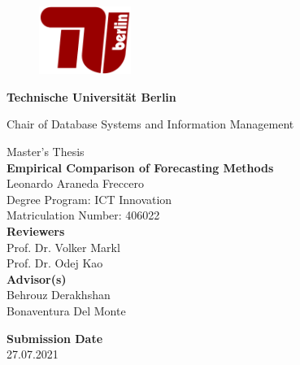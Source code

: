 \thispagestyle{empty}
\begin{center}

    \begin{figure}[t]
        \centering
        \includegraphics[width=3cm]{./img/TU-Berlin-Logo.pdf}%
    \end{figure}

    {\LARGE \textbf{Technische Universit\"at Berlin}}

    \vspace{0.5cm}

    {\large Chair of Database Systems and Information Management\\[1.6mm]}


    \vspace{2cm}

    {\LARGE Master's Thesis}\\

    \vspace{2.4cm}
    {\LARGE \textbf{Empirical Comparison of Forecasting Methods}}\\
    \vspace{1.0cm}
    Leonardo Araneda Freccero \\
    Degree Program: ICT Innovation\\
    Matriculation Number: 406022\\

    \vspace*{2.4cm}
    \textbf{Reviewers}\\
    Prof. Dr. Volker Markl\\
    Prof. Dr. Odej Kao\\
    \vspace*{0.4cm}
    \textbf{Advisor(s)}\\
    Behrouz Derakhshan\\
    Bonaventura Del Monte\\
    \vspace{0.4 cm}

    \textbf{Submission Date}\\
    27.07.2021\\ %
\end{center}

